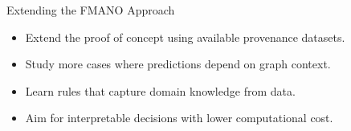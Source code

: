 \begin{frame}{Extending the FMANO Approach}
    \begin{itemize}
        \setlength\itemsep{0.8em}
        \item Extend the proof of concept using available provenance datasets.
        \item Study more cases where predictions depend on graph context.
        \item Learn rules that capture domain knowledge from data.
        \item Aim for interpretable decisions with lower computational cost.
    \end{itemize}
\end{frame}
